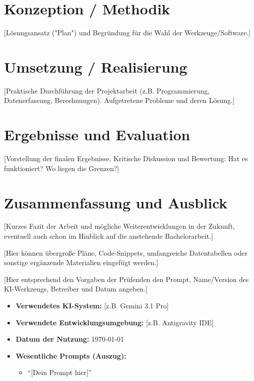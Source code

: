 \documentclass[12pt,twoside=false,a4paper,parskip]{scrbook}
\begin{document}
\chapter{Konzeption / Methodik} \label{sec:methodik}

[Lösungsansatz ("Plan") und Begründung für die Wahl der Werkzeuge/Software.]


\chapter{Umsetzung / Realisierung} \label{sec:umsetzung}

[Praktische Durchführung der Projektarbeit (z.B. Programmierung, Datenerfassung, Berechnungen). Aufgetretene Probleme und deren Lösung.]


\chapter{Ergebnisse und Evaluation} \label{sec:ergebnisse}

[Vorstellung der finalen Ergebnisse. Kritische Diskussion und Bewertung: Hat es funktioniert? Wo liegen die Grenzen?]


\chapter{Zusammenfassung und Ausblick} \label{sec:fazit}

[Kurzes Fazit der Arbeit und mögliche Weiterentwicklungen in der Zukunft, eventuell auch schon im Hinblick auf die anstehende Bachelorarbeit.]



\backmatter

\listoffigures
{}



\appendix
{}

 \label{appendix:beispiel}

[Hier können übergroße Pläne, Code-Snippets, umfangreiche Datentabellen oder sonstige ergänzende Materialien eingefügt werden.]

 \label{appendix:ki_deklaration}

[Hier entsprechend den Vorgaben der Prüfenden den Prompt, Name/Version des KI-Werkzeugs, Betreiber und Datum angeben.]
\begin{itemize}
  \item \textbf{Verwendetes KI-System:} [z.B. Gemini 3.1 Pro]
  \item \textbf{Verwendete Entwicklungsumgebung:} [z.B. Antigravity IDE]
  \item \textbf{Datum der Nutzung:} \today
  \item \textbf{Wesentliche Prompts (Auszug):}
        \begin{itemize}
          \item \enquote{[Dein Prompt hier]}
        \end{itemize}
\end{itemize}
\end{document}
